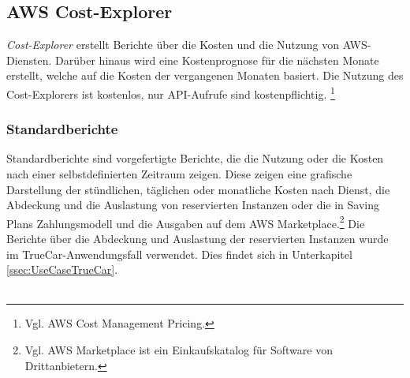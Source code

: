 \subsection{AWS Cost-Explorer}\label{ssec:Cost-Explorer}
\textit{Cost-Explorer} erstellt Berichte über die Kosten und die Nutzung von AWS-Diensten. Darüber hinaus wird eine Kostenprognose für die nächsten Monate erstellt, welche auf die Kosten der vergangenen Monaten basiert. Die Nutzung des Cost-Explorers ist kostenlos, nur API-Aufrufe sind kostenpflichtig. \footnote{Vgl. {AWS Cost Management Pricing\cite{AMZ22}.}}
\subsubsection*{Standardberichte}
Standardberichte sind vorgefertigte Berichte, die die Nutzung oder die Kosten nach einer selbstdefinierten Zeitraum zeigen. Diese zeigen eine grafische Darstellung der stündlichen, täglichen oder monatliche Kosten nach Dienst, die Abdeckung und die Auslastung von reservierten Instanzen oder die in Saving Plans Zahlungsmodell und die Ausgaben auf dem AWS Marketplace.\footnote{Vgl. {AWS Marketplace ist ein Einkaufskatalog für Software von Drittanbietern\cite{AMZ34}.}} Die Berichte über die Abdeckung und Auslastung der reservierten Instanzen wurde im TrueCar-Anwendungsfall verwendet. Dies findet sich in Unterkapitel \ref{ssec:UseCaseTrueCar}.
\\\\
